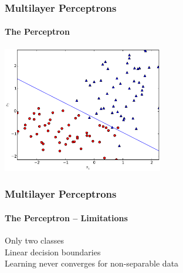\documentclass[xetex,professionalfont]{beamer}
\begin{document}

\begin{frame}
\frametitle{Multilayer Perceptrons}
\framesubtitle{The Perceptron}

\begin{center}
	\includegraphics[width=7cm]{figures/perceptron-classification.pdf} %
\end{center}

\end{frame}


\begin{frame}
\frametitle{Multilayer Perceptrons}
\framesubtitle{The Perceptron -- Limitations}

Only two classes\\\medskip %
Linear decision boundaries\\\medskip %
Learning never converges for non-separable data %

\end{frame}

\end{document}
